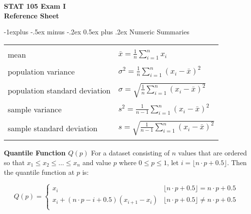 \documentclass[10pt,landscape]{article}
\makeatletter
\renewcommand{\subsection}{\@startsection{subsection}{2}{0mm}%
                                {-1explus -.5ex minus -.2ex}%
                                {0.5ex plus .2ex}%
                                {\normalfont\normalsize\bfseries}}
\makeatother
\begin{document}
\raggedright
\footnotesize
\begin{multicols}{2}


\setlength{\premulticols}{1pt}
\setlength{\postmulticols}{1pt}
\setlength{\multicolsep}{1pt}
\setlength{\columnsep}{2pt}

\begin{center}
   \Large{\textbf{STAT 105 Exam I}} \\
   \Large{\textbf{Reference Sheet}} \\
\end{center}

\subsection{Numeric Summaries}
\begin{tabular}{@{}ll@{}}
        & \\
mean    & $\bar{x} = \frac{1}{n}\sum_{i=1}^n x_i$ \\
        & \\
population variance  & $\sigma^2 = \frac{1}{n}\sum_{i=1}^n \left(x_i - \bar{x} \right)^2$ \\
        & \\
population standard deviation  & $\sigma = \sqrt{\frac{1}{n}\sum_{i=1}^n \left(x_i - \bar{x} \right)^2}$ \\
        & \\
sample variance  & $s^2 = \frac{1}{n-1}\sum_{i=1}^n \left(x_i - \bar{x} \right)^2$ \\
        & \\
sample standard deviation  & $s = \sqrt{\frac{1}{n-1}\sum_{i=1}^n \left(x_i - \bar{x} \right)^2}$ \\
        & \\
\end{tabular}

\textbf{Quantile Function $Q(p)$}
For a dataset consisting of $n$ values that are ordered so that $x_1 \le x_2 \le \ldots \le x_n$ and value $p$ where $0 \le p \le 1$, let $i = \lfloor n \cdot p + 0.5 \rfloor$. 
Then the quantile function at $p$ is:

\[
Q(p) = 
\begin{cases}
x_i & \lfloor n \cdot p + 0.5 \rfloor = n \cdot p + 0.5 \\
x_i + (n \cdot p - i + 0.5)(x_{i+1} - x_i) & \lfloor n \cdot p + 0.5 \rfloor \ne n \cdot p + 0.5 \\
\end{cases}
\]


\end{multicols}
\end{document}
